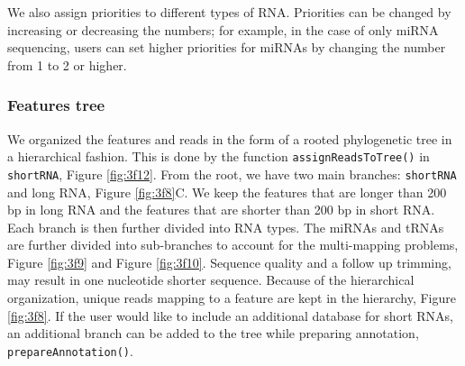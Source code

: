 \documentclass[12pt,twoside]{reedthesis}
\newenvironment{Shaded}{\begin{snugshade}}{\end{snugshade}}
\newcommand{\DecValTok}[1]{\textcolor[rgb]{0.00,0.00,0.81}{#1}}
\newcommand{\NormalTok}[1]{#1}
\newcommand{\SpecialCharTok}[1]{\textcolor[rgb]{0.00,0.00,0.00}{#1}}
\begin{document}
We also assign priorities to different types of RNA. Priorities can be
changed by increasing or decreasing the numbers; for example, in the
case of only miRNA sequencing, users can set higher priorities for
miRNAs by changing the number from 1 to 2 or higher.
\begin{Shaded}
\end{Shaded}
\hypertarget{ft}{%
\subsubsection{Features tree}\label{ft}}

We organized the features and reads in the form of a rooted phylogenetic
tree in a hierarchical fashion. This is done by the function
\texttt{assignReadsToTree()} in \texttt{shortRNA}, Figure \ref{fig:3f12}. From the
root, we have two main branches: \texttt{shortRNA} and long RNA, Figure
\ref{fig:3f8}C. We keep the features that are longer than 200 bp in long
RNA and the features that are shorter than 200 bp in short RNA. Each
branch is then further divided into RNA types. The miRNAs and tRNAs are
further divided into sub-branches to account for the multi-mapping
problems, Figure \ref{fig:3f9} and Figure \ref{fig:3f10}. Sequence
quality and a follow up trimming, may result in one nucleotide shorter
sequence. Because of the hierarchical organization, unique reads mapping
to a feature are kept in the hierarchy, Figure \ref{fig:3f8}. If the
user would like to include an additional database for short RNAs, an
additional branch can be added to the tree while preparing annotation,
\texttt{prepareAnnotation()}.
\end{document}

